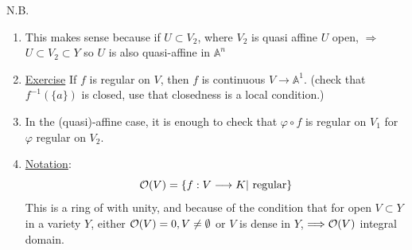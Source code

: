 \documentclass[11pt]{article}
\theoremstyle{definition}
\newcommand{\affn}{\mathbb A}
\newcommand{\calo}{{\cal O}}
\newcommand{\Lrta}{\Longrightarrow}
\newcommand{\lrta}{\longrightarrow}
\begin{document}
N.B. \begin{enumerate}
\item This makes sense because if $U\subset V_2$, where $V_2$ is quasi affine $U$ open, $\Lrta$ $U\subset V_2\subset Y$ so $U$ is also quasi-affine in $\affn^n$
\item \underline{Exercise} If $f$ is regular on $V$, then $f$ is continuous $V\lrta \affn^1$. (check that $f^{-1}(\{a\})$ is closed, use that closedness is a local condition.)
\item In the (quasi)-affine case, it is enough to check that $\varphi\circ f$ is regular on $V_1$ for $\varphi$ regular on $V_2$.
\item \underline{Notation}:
$$\calo(V)=\{f:V\lrta K|\text{ regular}\}$$
This is a ring of with unity, and because of the condition that for open $V\subset Y$ in a variety $Y$, either $\calo(V)=0,V\neq \emptyset$ or $V$ is dense in $Y$, $\Lrta \calo(V)$ integral domain. 
\end{enumerate}
\end{document}
